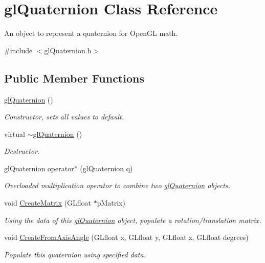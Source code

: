 \hypertarget{classgl_quaternion}{
\section{glQuaternion Class Reference}
\label{classgl_quaternion}
}


An object to represent a quaternion for OpenGL math.  




{\ttfamily \#include $<$glQuaternion.h$>$}

\subsection*{Public Member Functions}
\begin{DoxyCompactItemize}
\item 
\hyperlink{classgl_quaternion_ac389d49c55ef3b5fa303e04958c9400c}{glQuaternion} ()
\begin{DoxyCompactList}\small\item\em Constructor, sets all values to default. \end{DoxyCompactList}\item 
\hypertarget{classgl_quaternion_ac7f0565cb2061ac6dd4bd8bc9c07e8ae}{
virtual \hyperlink{classgl_quaternion_ac7f0565cb2061ac6dd4bd8bc9c07e8ae}{$\sim$glQuaternion} ()}
\label{classgl_quaternion_ac7f0565cb2061ac6dd4bd8bc9c07e8ae}

\begin{DoxyCompactList}\small\item\em Destructor. \end{DoxyCompactList}\item 
\hyperlink{classgl_quaternion}{glQuaternion} \hyperlink{classgl_quaternion_ac46764a018996045424f121b762c8565}{operator$\ast$} (\hyperlink{classgl_quaternion}{glQuaternion} q)
\begin{DoxyCompactList}\small\item\em Overloaded multiplication operator to combine two \hyperlink{classgl_quaternion}{glQuaternion} objects. \end{DoxyCompactList}\item 
void \hyperlink{classgl_quaternion_a2fdd5743dcaf58d1fc71ca0c35f9cda0}{CreateMatrix} (GLfloat $\ast$pMatrix)
\begin{DoxyCompactList}\small\item\em Using the data of this \hyperlink{classgl_quaternion}{glQuaternion} object, populate a rotation/translation matrix. \end{DoxyCompactList}\item 
void \hyperlink{classgl_quaternion_a52f7221972e53ac90d245d9bf0542c74}{CreateFromAxisAngle} (GLfloat x, GLfloat y, GLfloat z, GLfloat degrees)
\begin{DoxyCompactList}\small\item\em Populate this quaternion using specified data. \end{DoxyCompactList}\end{DoxyCompactItemize}
